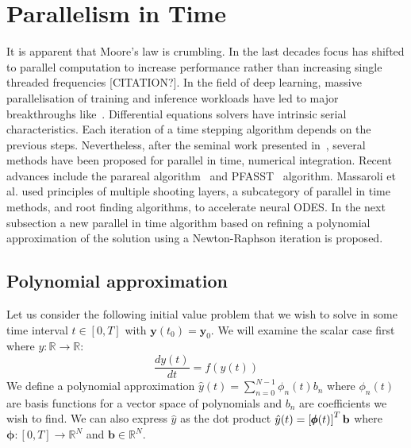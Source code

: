 \documentclass{article}
\begin{document}
    \section{Parallelism in Time}
    It is apparent that Moore's law is crumbling.
    In the last decades focus has shifted to parallel computation to increase performance rather than increasing single
    threaded frequencies [CITATION?].
    In the field of deep learning, massive parallelisation of training and inference workloads have led to major
    breakthroughs like~\cite{vaswani2017attention}.
    Differential equations solvers have intrinsic serial characteristics.
    Each iteration of a time stepping algorithm depends on the previous steps.
    Nevertheless, after the seminal work presented in~\cite{nievergelt1964parallel}, several methods have been proposed
    for parallel in time, numerical integration.
    Recent advances include the parareal algorithm~\cite{maday2002parareal} and PFASST~\cite{emmett2012toward} algorithm.
    Massaroli et al. \cite{massaroli2021differentiable} used principles of multiple shooting layers,
    a subcategory of parallel in time methods, and root finding algorithms, to accelerate neural ODES.
    In the next subsection a new parallel in time algorithm based on refining a polynomial approximation of the solution
    using a Newton-Raphson iteration is proposed.

    \subsection{Polynomial approximation}
    Let us consider the following initial value problem that we wish to solve in some time interval
    $t \in [0,T]$ with $\pmb{y} (t_0)= \pmb{y}_0$.
    We will examine the scalar case first where $y : \mathbb{R} \to \mathbb{R}$:
    \begin{equation}
        \frac{d y(t)}{dt} = f(y(t)) \label{dydt}
    \end{equation}
    We define a polynomial approximation  $\hat{y}(t)=\sum_{n=0}^{N-1} \phi_n(t) b_n$   where $ \phi_n(t) $ are basis functions
    for a vector space of polynomials and $b_n$ are coefficients we wish to find.
    We can also express $\hat{y}$ as the dot product $\hat{y}(t)= \left[ \pmb{\phi}(t)\right]^T \textbf b$ where
    $\pmb{\phi} : [0,T] \to \mathbb{R}^N$ and $\pmb{b} \in \mathbb{R}^N$.
\end{document}
